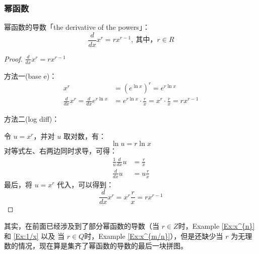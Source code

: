 \documentclass{ctexart}
\numberwithin{equation}{section}
\numberwithin{figure}{section}
\begin{document}
\subsubsection{幂函数}

幂函数的导数「the derivative of the powers」：
\begin{equation}
    \frac{d}{dx}x^{r} = rx^{r-1}, \ \text{其中，} r\in R
\end{equation}
\begin{proof}
    \(\frac{d}{dx}x^{r} = rx^{r-1}\)

    方法一(base e)：
    \begin{align*}
        x^{r}                                      & = \left(e^{\ln x}\right)^{r} = e^{r\ln x}                           \\
        \frac{d}{dx}x^{r} = \frac{d}{dx}e^{r\ln x} & = e^{r\ln x} \cdot \frac{r}{x} = x^{r} \cdot \frac{r}{x} = rx^{r-1}
    \end{align*}

    方法二(log diff)：

    令 \(u = x^{r}\)，并对 \(u\) 取对数，有：
    \begin{equation*}
        \ln u = r\ln x
    \end{equation*}
    对等式左、右两边同时求导，可得：
    \begin{align*}
        \frac{1}{u}\frac{d}{dx}u & = \frac{r}{x}  \\
        \frac{d}{dx}u            & = u\frac{r}{x}
    \end{align*}
    最后，将 \(u = x^{r}\) 代入，可以得到：
    \begin{equation*}
        \frac{d}{dx}x^{r} = x^{r}\frac{r}{x} = rx^{r-1}
    \end{equation*}
\end{proof}

其实，在前面已经涉及到了部分幂函数的导数（当 \(r \in Z\)时，Example \ref{Ex:x^{n}} 和 \ref{Ex:1/x} 以及 当 \(r \in Q\)时，Example \ref{Ex:x^{m/n}}），但是还缺少当 \(r\) 为无理数的情况，现在算是集齐了幂函数的导数的最后一块拼图。

\newpage
\nocite{CalculusSingleVariable}

\end{document}

